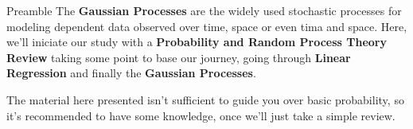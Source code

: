 \begin{frame}{Preamble} 
 The \textbf{Gaussian Processes} are the widely used stochastic processes for modeling dependent data observed over time, space or even tima and space. Here, we'll iniciate our study with a \textbf{Probability and Random Process Theory Review} taking some point to base our journey, going through \textbf{Linear Regression} and finally the \textbf{Gaussian Processes}. \par
 
The material here presented isn't sufficient to guide you over basic probability, so it's recommended to have some knowledge, once we'll just take a simple review.
\end{frame}